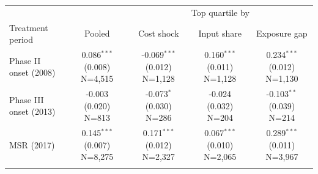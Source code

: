 \begin{tabular}{lcccc}
\toprule
 & & \multicolumn{3}{c}{Top quartile by} \\
\cmidrule(lr){3-5}
Treatment period & Pooled & Cost shock & Input share & Exposure gap \\
\midrule
Phase II onset (2008) & \makecell{0.086$^{***}$ \\ \footnotesize{(0.008)} \\ \footnotesize{N=4,515}} & \makecell{-0.069$^{***}$ \\ \footnotesize{(0.012)} \\ \footnotesize{N=1,128}} & \makecell{0.160$^{***}$ \\ \footnotesize{(0.011)} \\ \footnotesize{N=1,128}} & \makecell{0.234$^{***}$ \\ \footnotesize{(0.012)} \\ \footnotesize{N=1,130}} \\\addlinespace
Phase III onset (2013) & \makecell{-0.003 \\ \footnotesize{(0.020)} \\ \footnotesize{N=813}} & \makecell{-0.073$^{*}$ \\ \footnotesize{(0.030)} \\ \footnotesize{N=286}} & \makecell{-0.024 \\ \footnotesize{(0.032)} \\ \footnotesize{N=204}} & \makecell{-0.103$^{**}$ \\ \footnotesize{(0.039)} \\ \footnotesize{N=214}} \\\addlinespace
MSR (2017) & \makecell{0.145$^{***}$ \\ \footnotesize{(0.007)} \\ \footnotesize{N=8,275}} & \makecell{0.171$^{***}$ \\ \footnotesize{(0.012)} \\ \footnotesize{N=2,327}} & \makecell{0.067$^{***}$ \\ \footnotesize{(0.010)} \\ \footnotesize{N=2,065}} & \makecell{0.289$^{***}$ \\ \footnotesize{(0.011)} \\ \footnotesize{N=3,967}} \\\addlinespace
\bottomrule
\end{tabular}
